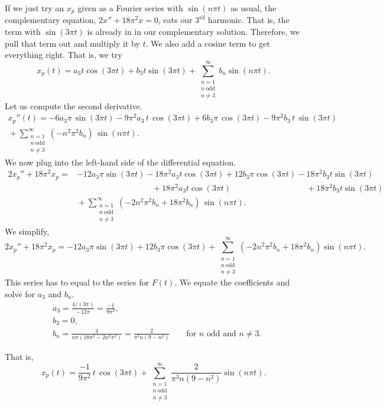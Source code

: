 \begin{example}
If we just try an $x_p$ given as a Fourier series with $\sin (n\pi t)$ as usual,
the complementary equation, $2x''+18\pi^2x=0$, eats our $3^\text{rd}$ harmonic.  That is, the term
with $\sin(3 \pi t)$
is already in
in our complementary solution.
Therefore, we pull that term out and
multiply it by $t$.  We also add a cosine term to get everything right.
That is, we try
\begin{equation*}
x_p(t) =
a_3
t \cos (3 \pi t )
+
b_3
t \sin (3 \pi t)
+
\sum_{\substack{n=1 \\ n~\text{odd} \\ n\not= 3}}^\infty
b_n
\sin (n \pi t) . 
\end{equation*}
Let us compute the second derivative.
\begin{multline*}
x_p''(t) =
- 6 a_3
\pi \, \sin (3 \pi t) - 9\pi^2 a_3 \, t \, \cos (3 \pi t)
+
6 b_3
\pi \, \cos (3 \pi t) - 9\pi^2 b_3 \, t \, \sin (3 \pi t)
\\
{} +
\sum_{\substack{n=1 \\ n~\text{odd} \\ n\not= 3}}^\infty
(-n^2 \pi^2 b_n ) \,
\sin (n \pi t) . 
\end{multline*}
We now plug into the left-hand side of the differential equation.
\begin{align*}
2x_p'' + 18\pi^2 x_p 
= & 
- 12 a_3 \pi \sin (3 \pi t)
- 18\pi^2 a_3 t \cos (3 \pi t)
+ 12 b_3 \pi \cos (3 \pi t)
- 18\pi^2 b_3 t \sin (3 \pi t)
\\
& \phantom{\, - 12 a_3 \pi \sin (3 \pi t)} ~
{} + 18 \pi^2 a_3 t \cos (3 \pi t)
\phantom{\, + 12 b_3 \pi \cos (3 \pi t)} ~
{} + 18 \pi^2 b_3 t \sin (3 \pi t)
\\
& {} + \sum_{\substack{n=1 \\ n~\text{odd} \\ n\not= 3}}^\infty
(-2n^2 \pi^2 b_n + 18\pi^2 b_n) \,
\sin (n \pi t) . 
\end{align*}
We simplify,
\begin{equation*}
2x_p'' + 18\pi^2 x_p =
- 12 a_3
\pi \sin (3 \pi t)
+
12 b_3
\pi \cos (3 \pi t)
+
\sum_{\substack{n=1 \\ n~\text{odd} \\ n\not= 3}}^\infty
(-2n^2 \pi^2 b_n + 18\pi^2 b_n)
\sin (n \pi t) . 
\end{equation*}
This series has to equal to the series for $F(t)$.
We equate the coefficients and solve for $a_3$ and $b_n$.
\begin{align*}
& a_3 = \frac{4/(3\pi)}{-12\pi} = \frac{-1}{9\pi^2} , \\
& b_3 = 0 , \\
& b_n = \frac{4}{n\pi(18\pi^2 - 2n^2 \pi^2)} 
= \frac{2}{\pi^3 n(9 - n^2)} \qquad \text{for } n \text{ odd and } n\not=3 .
\end{align*}

That is,
\begin{equation*}
x_p(t) =
\frac{-1}{9\pi^2}
\,
t \, \cos (3 \pi t)
+
\sum_{\substack{n=1 \\ n~\text{odd} \\ n\not= 3}}^\infty
\frac{2}{\pi^3 n(9 - n^2)}
\sin (n \pi t) . 
\end{equation*}
\end{example}

